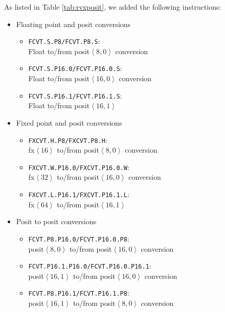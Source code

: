 As listed in Table \ref{tab:rvxposit}, we added the following instructions:
\begin{itemize}
    \item Floating point and posit conversions
    \begin{itemize}
        \item \texttt{FCVT.S.P8/FCVT.P8.S}: \\Float to/from posit$\left<8,0\right>$ conversion
        \item \texttt{FCVT.S.P16.0/FCVT.P16.0.S}:\\ Float to/from posit$\left<16,0\right>$ conversion
        \item \texttt{FCVT.S.P16.1/FCVT.P16.1.S}: \\Float to/from posit$\left<16,1\right>$
    \end{itemize}
    \item Fixed point and posit conversions
    \begin{itemize}
        \item \texttt{FXCVT.H.P8/FXCVT.P8.H}: \\fx$\left<16\right>$ to/from posit$\left<8,0\right>$ conversion
        \item \texttt{FXCVT.W.P16.0/FXCVT.P16.0.W}:\\ fx$\left<32\right>$ to/from posit$\left<16,0\right>$ conversion
        \item \texttt{FXCVT.L.P16.1/FXCVT.P16.1.L}: \\fx$\left<64\right>$ to/from posit$\left<16,1\right>$
    \end{itemize}   
    \item Posit to posit conversions
    \begin{itemize}
        \item \texttt{FCVT.P8.P16.0/FCVT.P16.0.P8}: \\posit$\left<8,0\right>$ to/from posit$\left<16,0\right>$ conversion
        \item \texttt{FCVT.P16.1.P16.0/FCVT.P16.0.P16.1}:\\
        posit$\left<16,1\right>$ to/from posit$\left<16,0\right>$ conversion
        \item \texttt{FCVT.P8.P16.1/FCVT.P16.1.P8}:
        \\posit$\left<16,1\right>$ to/from posit$\left<8,0\right>$ conversion
        \end{itemize}       
\end{itemize}

